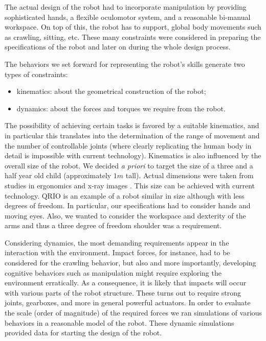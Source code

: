 The actual design of the robot had to incorporate manipulation by providing 
sophisticated hands, a flexible oculomotor system, and a reasonable bi-manual 
workspace. On top of this, the robot has to support, global body movements such as 
crawling, sitting, etc. These many constraints were considered in preparing 
the specifications of the robot and later on during the whole design process.

The behaviors we set forward for representing the robot's skills generate two 
types of constraints:
\begin{itemize}
	\item kinematics: about the geometrical construction of the robot;
	\item dynamics: about the forces and torques we require from the robot.
\end{itemize}

The possibility of achieving certain tasks is favored by a suitable kinematics, 
and in particular this translates into the determination of the range of movement 
and the number of controllable joints (where clearly replicating the human body 
in detail is impossible with current technology). Kinematics is also 
influenced by the overall size of the robot. We decided {\em a priori} to target the 
size of a three and a half year old child (approximately $1m$ tall). Actual 
dimensions were taken from studies in ergonomics and x-ray images \cite{tilley01measure}. 
This size can be achieved with current technology. QRIO \cite{sony-qrio} is an example 
of a robot similar in size although with less degrees of freedom. In particular, 
our specifications had to consider hands and moving eyes. Also, we wanted to 
consider the workspace and dexterity of the arms and thus a three degree of 
freedom shoulder was a requirement. 


Considering dynamics, the most demanding requirements appear in the 
interaction with the environment. Impact forces, for instance, had to be 
considered for the crawling behavior, but also and more importantly, developing 
cognitive behaviors such as manipulation might require exploring the environment 
erratically. As a consequence, it is likely that impacts will occur with
various parts of the robot structure. These turns out to require strong 
joints, gearboxes, and more in general powerful actuators. In order to evaluate 
the scale (order of magnitude) of the required forces we ran simulations 
of various behaviors in a reasonable model of the robot. These dynamic simulations 
provided data for starting the design of the robot.

